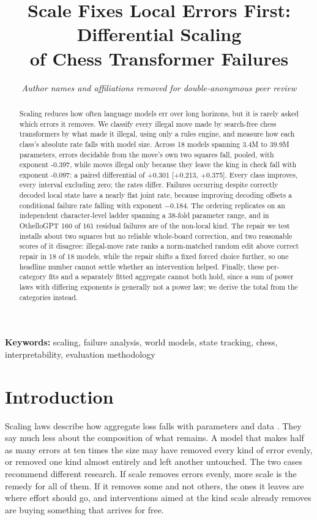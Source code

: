 \documentclass[11pt]{article}
\title{\bf Scale Fixes Local Errors First: Differential Scaling\\of Chess Transformer Failures}
\author{\normalsize\itshape Author names and affiliations removed for double-anonymous peer review}
\date{}
\begin{document}
\maketitle

\begin{abstract}
Scaling reduces how often language models err over long horizons, but it is rarely
asked which errors it removes. We classify every illegal move made by search-free
chess transformers by what made it illegal, using only a rules engine, and measure
how each class's absolute rate falls with model size. Across
18 models spanning 3.4M to 39.9M parameters, errors decidable
from the move's own two squares fall, pooled, with exponent -0.397, while
moves illegal only because they leave the king in check fall with exponent
-0.097: a paired differential of +0.301 [+0.213,
+0.375]. Every
class improves, every interval excluding zero; the rates differ. Failures occurring despite
correctly decoded local state have a nearly flat joint rate, because improving
decoding offsets a conditional failure rate falling with exponent $-$0.184. The
ordering replicates on an independent character-level ladder spanning a
38-fold parameter range, and in OthelloGPT 160 of 161 residual
failures are of the non-local kind. The repair we test installs about two
squares but no reliable whole-board correction, and two reasonable scores of it
disagree:
illegal-move rate ranks a norm-matched random edit above correct repair in
18 of 18 models, while the repair shifts a fixed forced choice
further, so one headline number cannot settle whether an intervention helped.
Finally, these per-category fits and a separately fitted aggregate cannot both
hold, since a sum of power laws with differing exponents is generally not a power
law; we derive the total from the categories instead.
\end{abstract}

\noindent\textbf{Keywords:} scaling, failure analysis, world models, state
tracking, chess, interpretability, evaluation methodology

\section{Introduction}

Scaling laws describe how aggregate loss falls with parameters and data
\citep{kaplan2020scaling,hoffmann2022training}. They say much less about the
composition of what remains. A model that makes half as many errors at ten times
the size may have removed every kind of error evenly, or removed one kind almost
entirely and left another untouched. The two cases recommend different research.
If scale removes errors evenly, more scale is the remedy for all of them. If it
removes some and not others, the ones it leaves are where effort should go, and
interventions aimed at the kind scale already removes are buying something that
arrives for free.
\end{document}

